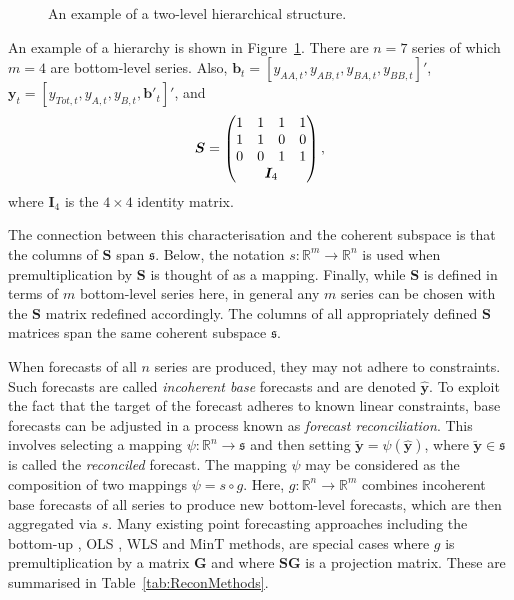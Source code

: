 \documentclass[a4paper,12pt]{article}
\theoremstyle{definition}
\begin{document}
\begin{figure}[!htb]
	\begin{center}
		 
		 
		\qobitree
	\end{center}
	\caption{An example of a two-level hierarchical structure.}\label{fig:twoL-hier}
\end{figure}
An example of a hierarchy is shown in Figure~\ref{fig:twoL-hier}. There are $n=7$ series of which $m=4$ are bottom-level series. Also, $\bm{b}_t = [y_{AA,t}, y_{AB,t}, y_{BA,t}, y_{BB,t}]'$, $\bm{y}_t = [y_{Tot,t},y_{A,t}, y_{B,t},\bm{b}'_t]'$, and
\[
\bm{S} = \begin{pmatrix}
1 & 1 & 1 & 1 \\
1 & 1 & 0 & 0 \\
0 & 0 & 1 & 1 \\
& \multicolumn{2}{c}{\bm{I}_4} &
\end{pmatrix},
\]
where $\bm{I}_4$ is the $4\times 4$ identity matrix.

The connection between this characterisation and the coherent subspace is that the columns of $\bm{S}$ span $\mathfrak{s}$. Below, the notation $s:\mathbb{R}^m\rightarrow\mathbb{R}^n$ is used when premultiplication by $\bm{S}$ is thought of as a mapping. Finally, while $\bm{S}$ is defined in terms of $m$ bottom-level series here, in general any $m$ series can be chosen with the $\bm{S}$ matrix redefined accordingly. The columns of all appropriately defined $\bm{S}$ matrices span the same coherent subspace $\mathfrak{s}$.

When forecasts of all $n$ series are produced, they may not adhere to constraints. Such forecasts are called \emph{incoherent base} forecasts and are denoted $\hat{\bm{y}}$. To exploit the fact that the target of the forecast adheres to known linear constraints, base forecasts can be adjusted in a process known as \emph{forecast reconciliation}. This involves selecting a mapping $\psi:\mathbb{R}^n\rightarrow\mathfrak{s}$ and then setting $\tilde{\bm{y}}=\psi(\hat{\bm{y}})$, where $\tilde{\bm{y}}\in\mathfrak{s}$ is called the \emph{reconciled} forecast. The mapping $\psi$ may be considered as the composition of two mappings $\psi=s\circ g$. Here, $g:\mathbb{R}^{n}\rightarrow\mathbb{R}^{m}$ combines incoherent base forecasts of all series to produce new bottom-level forecasts, which are then aggregated via $s$. Many existing point forecasting approaches including the bottom-up \citep{Dunn1976}, OLS \citep{HynEtAl2011}, WLS \citep[][]{AthEtAl2017} and MinT \citep{WicEtAl2019} methods, are special cases where $g$ is premultiplication by a matrix $\bm{G}$ and where $\bm{S}\bm{G}$ is a projection matrix. These are summarised in Table~\ref{tab:ReconMethods}.
\end{document}
